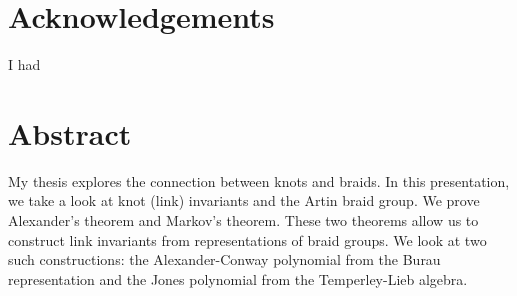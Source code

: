 \SkipTocEntry\chapter*{Acknowledgements}

I had

\SkipTocEntry\chapter*{Abstract}
  My thesis explores the connection between knots and braids. In this presentation, we take a look at knot (link) invariants and the Artin braid group. We prove Alexander's theorem and Markov's theorem. These two theorems allow us to construct link invariants from representations of braid groups. We look at two such constructions: the Alexander-Conway polynomial from the Burau representation and the Jones polynomial from the Temperley-Lieb algebra.